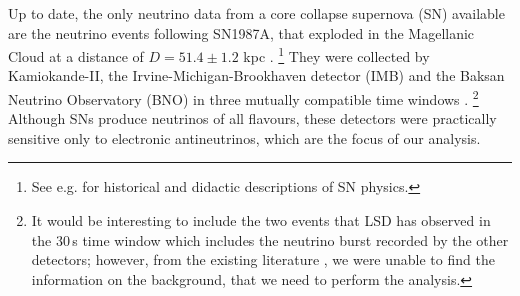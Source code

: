 \documentclass[a4paper,11pt]{article}
\begin{document}
  

%
%


Up to date, the only   neutrino data from a core collapse supernova (SN) available  are the neutrino events following  SN1987A,  
that exploded in the Magellanic Cloud at a distance of \( D = 51.4 \pm 1.2 \) kpc \cite{Panagia}. \footnote{See e.g. \cite{woosley1986physics,Roulet:2022akk, Ricciardi:2024dka}   for historical and didactic descriptions of SN physics.} They were collected by Kamiokande-II, the Irvine-Michigan-Brookhaven detector (IMB) and the Baksan Neutrino Observatory (BNO) in three mutually compatible time windows \cite{hirataPhysRevLett.58.1490,PhysRevD.38.448,PhysRevLett.58.1494,PhysRevD.37.3361,ALEXEYEV1988209}. \footnote{It  would be interesting to include the two events that LSD has observed in the 30\,s time window which includes the neutrino burst recorded by the other detectors; however, from the existing literature   \cite{Badino:1984ww,Aglietta:1987it,Aglietta:1987we,Dadykin:1987ek,Saavedra:1987tz}, we were unable to find the information on the background, that we need to perform the analysis.}
%
%
Although SNs produce neutrinos of all flavours, these detectors  were practically  sensitive only to electronic antineutrinos, which are the focus of our analysis. 
\end{document}
